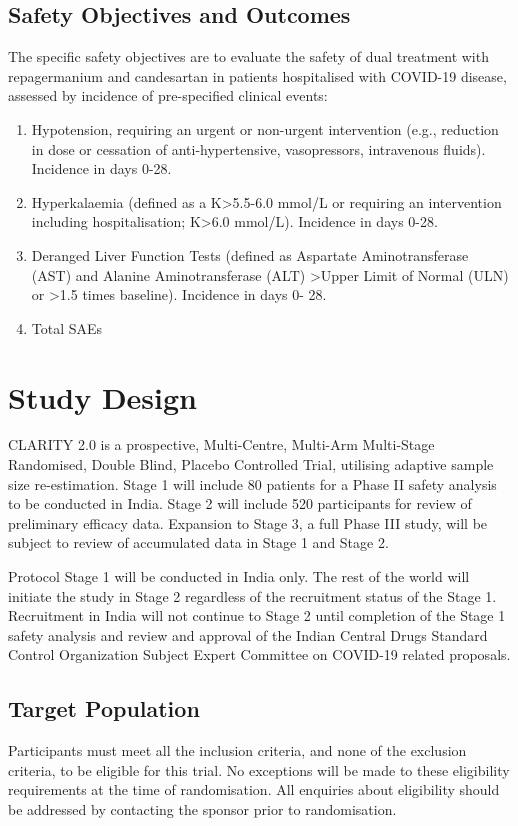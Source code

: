\documentclass[11pt,parskip=half-]{scrartcl}
\begin{document}
\subsection{Safety Objectives and Outcomes}
The specific safety objectives are to evaluate the safety of dual treatment with repagermanium and candesartan in patients hospitalised with COVID-19 disease, assessed by incidence of pre-specified clinical events:

\begin{enumerate}[resume]
    \item Hypotension, requiring an urgent or non-urgent intervention (e.g., reduction in dose or cessation of anti-hypertensive, vasopressors, intravenous fluids). Incidence in days 0-28.
    \item  Hyperkalaemia (defined as a K>5.5-6.0 mmol/L or requiring an intervention including hospitalisation; K>6.0 mmol/L). Incidence in days 0-28.
    \item Deranged Liver Function Tests (defined as Aspartate Aminotransferase (AST) and Alanine Aminotransferase (ALT) >Upper Limit of Normal (ULN) or >1.5 times baseline). Incidence in days 0- 28.
    \item Total SAEs
\end{enumerate}

\clearpage

\section{Study Design}
CLARITY 2.0 is a prospective, Multi-Centre, Multi-Arm Multi-Stage Randomised, Double Blind, Placebo Controlled Trial, utilising adaptive sample size re-estimation. Stage 1 will include 80 patients for a Phase II safety analysis to be conducted in India. Stage 2 will include 520 participants for review of preliminary efficacy data. Expansion to Stage 3, a full Phase III study, will be subject to review of accumulated data in Stage 1 and Stage 2.

Protocol Stage 1 will be conducted in India only. The rest of the world will initiate the study in Stage 2 regardless of the recruitment status of the Stage 1. Recruitment in India will not continue to Stage 2 until completion of the Stage 1 safety analysis and review and approval of the Indian Central Drugs Standard Control Organization Subject Expert Committee on COVID-19 related proposals.


\subsection{Target Population}
Participants must meet all the inclusion criteria, and none of the exclusion criteria, to be eligible for this trial. No exceptions will be made to these eligibility requirements at the time of randomisation. All enquiries about eligibility should be addressed by contacting the sponsor prior to randomisation.
\end{document}
